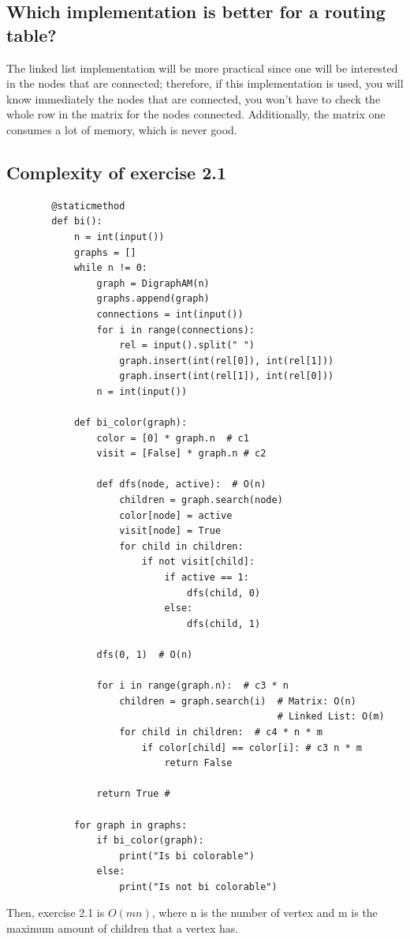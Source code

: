 \documentclass[a4paper,12pt]{article}
\begin{document}
    \subsection{Which implementation is better for a routing table?}
    The linked list implementation will be more practical since one will be interested in the
    nodes that are connected; therefore, if this implementation is used, you will know immediately
    the nodes that are connected, you won't have to check the whole row in the matrix for the nodes
    connected. Additionally, the matrix one consumes a lot of memory, which is never good.

    \subsection{Complexity of exercise 2.1}
      \begin{Verbatim}
        @staticmethod
        def bi():
            n = int(input())
            graphs = []
            while n != 0:
                graph = DigraphAM(n)
                graphs.append(graph)
                connections = int(input())
                for i in range(connections):
                    rel = input().split(" ")
                    graph.insert(int(rel[0]), int(rel[1]))
                    graph.insert(int(rel[1]), int(rel[0]))
                n = int(input())

            def bi_color(graph):
                color = [0] * graph.n  # c1
                visit = [False] * graph.n # c2

                def dfs(node, active):  # O(n)
                    children = graph.search(node)
                    color[node] = active
                    visit[node] = True
                    for child in children:
                        if not visit[child]:
                            if active == 1:
                                dfs(child, 0)
                            else:
                                dfs(child, 1)

                dfs(0, 1)  # O(n)

                for i in range(graph.n):  # c3 * n
                    children = graph.search(i)  # Matrix: O(n)
                                                # Linked List: O(m)
                    for child in children:  # c4 * n * m
                        if color[child] == color[i]: # c3 n * m
                            return False

                return True #

            for graph in graphs:
                if bi_color(graph):
                    print("Is bi colorable")
                else:
                    print("Is not bi colorable")

      \end{Verbatim}
      Then, exercise 2.1 is $O(mn)$, where n is the number of vertex and m is the maximum amount of
      children that a vertex has.
\end{document}
